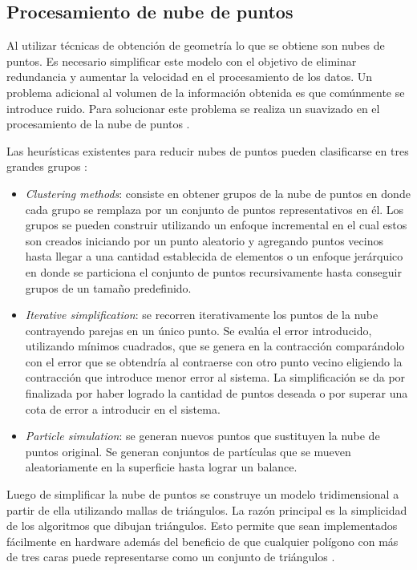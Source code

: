\subsection{Procesamiento de nube de puntos}

Al utilizar técnicas de obtención de geometría lo que se obtiene son nubes de puntos. Es necesario simplificar este modelo con el objetivo de eliminar redundancia y aumentar la velocidad en el procesamiento de los datos. Un problema adicional al volumen de la información obtenida es que comúnmente se introduce ruido. Para solucionar este problema se realiza un suavizado en el procesamiento de la nube de puntos \cite{PCloudSimplify}.

Las heurísticas existentes para reducir nubes de puntos pueden clasificarse en tres grandes grupos \cite{PntCloud}:
\begin{itemize}
   \item \emph{Clustering methods}: consiste en obtener grupos de la nube de puntos en donde cada grupo se remplaza por un conjunto de puntos representativos en él. Los grupos se pueden construir utilizando un enfoque incremental en el cual estos son creados iniciando por un punto aleatorio y agregando puntos vecinos hasta llegar a una cantidad establecida de elementos o un enfoque jerárquico en donde se particiona el conjunto de puntos recursivamente hasta conseguir grupos de un tamaño predefinido.
   \item \emph{Iterative simplification}: se recorren iterativamente los puntos de la nube contrayendo parejas en un único punto. Se evalúa el error introducido, utilizando mínimos cuadrados, que se genera en la contracción comparándolo con el error que se obtendría al contraerse con otro punto vecino eligiendo la contracción que introduce menor error al sistema. La simplificación se da por finalizada por haber logrado la cantidad de puntos deseada o por superar una cota de error a introducir en el sistema.
   \item \emph{Particle simulation}: se generan nuevos puntos que sustituyen la nube de puntos original. Se generan conjuntos de partículas que se mueven aleatoriamente en la superficie hasta lograr un balance. %
\end{itemize}

Luego de simplificar la nube de puntos se construye un modelo tridimensional a partir de ella utilizando mallas de triángulos. La razón principal es la simplicidad de los algoritmos que dibujan triángulos. Esto permite que sean implementados fácilmente en hardware además del beneficio de que cualquier polígono con más de tres caras puede representarse como un conjunto de triángulos \cite{PCloudTriangle}.


